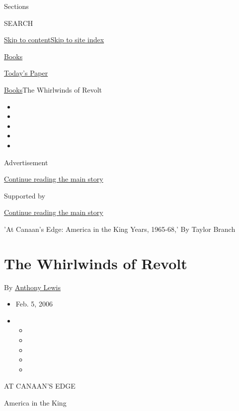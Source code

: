 Sections

SEARCH

\protect\hyperlink{site-content}{Skip to
content}\protect\hyperlink{site-index}{Skip to site index}

\href{https://www.nytimes.com/section/books}{Books}

\href{https://myaccount.nytimes.com/auth/login?response_type=cookie\&client_id=vi}{}

\href{https://www.nytimes.com/section/todayspaper}{Today's Paper}

\href{/section/books}{Books}\textbar{}The Whirlwinds of Revolt

\begin{itemize}
\item
\item
\item
\item
\item
\end{itemize}

Advertisement

\protect\hyperlink{after-top}{Continue reading the main story}

Supported by

\protect\hyperlink{after-sponsor}{Continue reading the main story}

'At Canaan's Edge: America in the King Years, 1965-68,' By Taylor Branch

\hypertarget{the-whirlwinds-of-revolt}{%
\section{The Whirlwinds of Revolt}\label{the-whirlwinds-of-revolt}}

By \href{https://www.nytimes.com/by/anthony-lewis}{Anthony Lewis}

\begin{itemize}
\item
  Feb. 5, 2006
\item
  \begin{itemize}
  \item
  \item
  \item
  \item
  \item
  \end{itemize}
\end{itemize}

AT CANAAN'S EDGE

America in the King

